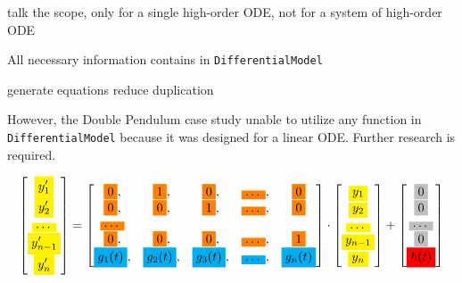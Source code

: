 talk the scope, only for a single high-order ODE, not for a system of high-order ODE

All necessary information contains in \verb|DifferentialModel|

generate equations
reduce duplication

However, the Double Pendulum case study unable to utilize any function in \verb|DifferentialModel| because it was designed for a linear ODE. Further research is required.

\begin{equation} \label{eq_foodeexamplecolor}
	\begin{bmatrix}
		\highlight{yellow}{y_{1}'} \\
    \highlight{yellow}{y_{2}'} \\
    \highlight{yellow}{\dots} \\
    \highlight{yellow}{y_{n-1}'} \\
    \highlight{yellow}{y_{n}'}
	\end{bmatrix}
    = 
  \begin{bmatrix}
		\highlight{orange}{0}, & \highlight{orange}{1}, & \highlight{orange}{0}, & \highlight{orange}{\dots}, & \highlight{orange}{0} \\
    \highlight{orange}{0}, & \highlight{orange}{0}, & \highlight{orange}{1}, & \highlight{orange}{\dots}, & \highlight{orange}{0} \\
    \highlight{orange}{\dots} \\
    \highlight{orange}{0}, & \highlight{orange}{0}, & \highlight{orange}{0}, & \highlight{orange}{\dots}, & \highlight{orange}{1} \\
    \highlight{cyan}{g_{1}(t)}, & \highlight{cyan}{g_{2}(t)}, & \highlight{cyan}{g_{3}(t)}, & \highlight{cyan}{\dots}, & \highlight{cyan}{g_{n}(t)}
	\end{bmatrix}
    \cdot
  \begin{bmatrix}
		\highlight{yellow}{y_{1}} \\
    \highlight{yellow}{y_{2}} \\
    \highlight{yellow}{\dots} \\
    \highlight{yellow}{y_{n-1}} \\
    \highlight{yellow}{y_{n}}
	\end{bmatrix}
    + 
  \begin{bmatrix}
    \highlight{lightgray}{0} \\
    \highlight{lightgray}{0} \\
    \highlight{lightgray}{\dots} \\
    \highlight{lightgray}{0} \\
    \highlight{red}{h(t)}
	\end{bmatrix}
\end{equation}

